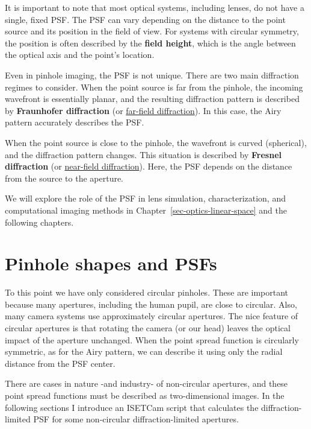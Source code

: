 \documentclass[
  letterpaper,
]{book}
\begin{document}
It is important to note that most optical systems, including lenses, do
not have a single, fixed PSF. The PSF can vary depending on the distance
to the point source and its position in the field of view. For systems
with circular symmetry, the position is often described by the
\textbf{field height}, which is the angle between the optical axis and
the point's location.

Even in pinhole imaging, the PSF is not unique. There are two main
diffraction regimes to consider. When the point source is far from the
pinhole, the incoming wavefront is essentially planar, and the resulting
diffraction pattern is described by \textbf{Fraunhofer diffraction} (or
\href{https://en.wikipedia.org/wiki/Fraunhofer_diffraction}{far-field
diffraction}). In this case, the Airy pattern accurately describes the
PSF.

When the point source is close to the pinhole, the wavefront is curved
(spherical), and the diffraction pattern changes. This situation is
described by \textbf{Fresnel diffraction} (or
\href{https://en.wikipedia.org/wiki/Fresnel_diffraction}{near-field
diffraction}). Here, the PSF depends on the distance from the source to
the aperture.

We will explore the role of the PSF in lens simulation,
characterization, and computational imaging methods in
Chapter~\ref{sec-optics-linear-space} and the following chapters.

\section{Pinhole shapes and PSFs}\label{pinhole-shapes-and-psfs}

To this point we have only considered circular pinholes. These are
important because many apertures, including the human pupil, are close
to circular. Also, many camera systems use approximately circular
apertures. The nice feature of circular apertures is that rotating the
camera (or our head) leaves the optical impact of the aperture
unchanged. When the point spread function is circularly symmetric, as
for the Airy pattern, we can describe it using only the radial distance
from the PSF center.

There are cases in nature -and industry- of non-circular apertures, and
these point spread functions must be described as two-dimensional
images. In the following sections I introduce an ISETCam script that
calculates the diffraction-limited PSF for some non-circular
diffraction-limited apertures.
\end{document}
